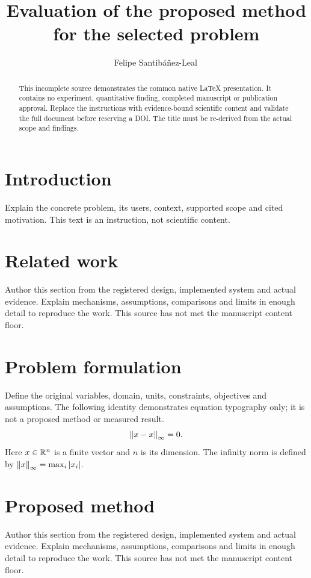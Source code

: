 \documentclass[11pt]{article}
\title{Evaluation of the proposed method for the selected problem}
\author{Felipe Santib\'a\~nez-Leal\,\orcidlink{0000-0002-0150-3246}}
\date{\docdate}
\begin{document}
\maketitle
\thispagestyle{plain}
\headerblock
\begin{abstract}
This incomplete source demonstrates the common native LaTeX presentation. It contains no experiment, quantitative finding, completed manuscript or publication approval. Replace the instructions with evidence-bound scientific content and validate the full document before reserving a DOI. The title must be re-derived from the actual scope and findings.
\end{abstract}

\section{Introduction}\label{sec:introduction}
Explain the concrete problem, its users, context, supported scope and cited motivation. This text is an instruction, not scientific content.

\section{Related work}\label{sec:related-work}
Author this section from the registered design, implemented system and actual evidence. Explain mechanisms, assumptions, comparisons and limits in enough detail to reproduce the work. This source has not met the manuscript content floor.

\section{Problem formulation}\label{sec:problem-formulation}
Define the original variables, domain, units, constraints, objectives and assumptions. The following identity demonstrates equation typography only; it is not a proposed method or measured result.
\begin{equation}\label{eq:identity} \left\lVert x-x\right\rVert_{\infty} = 0. \end{equation}
Here $x\in\mathbb{R}^n$ is a finite vector and $n$ is its dimension. The infinity norm is defined by $\left\lVert x\right\rVert_{\infty}=\max_i |x_i|$.

\section{Proposed method}\label{sec:proposed-method}
Author this section from the registered design, implemented system and actual evidence. Explain mechanisms, assumptions, comparisons and limits in enough detail to reproduce the work. This source has not met the manuscript content floor.
\end{document}

